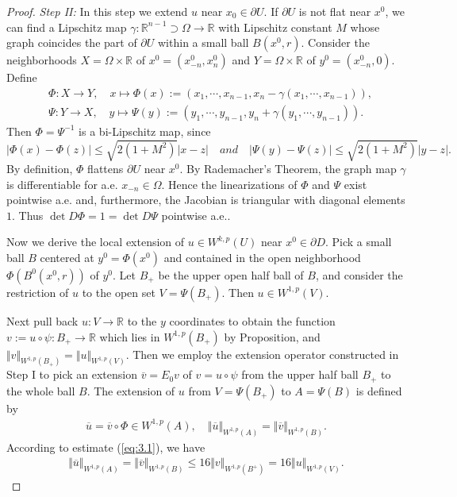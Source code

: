 \documentclass{article}
\numberwithin{equation}{section}
\newcommand{\bbR}{\mathbb{R}}
\newcommand{\ol}{\overline}
\theoremstyle{plain}
\theoremstyle{definition}
\begin{document}
\begin{proof}
\textit{Step II:} In this step we extend $u$ near $x_0\in\partial U$. If $\partial U$ is not flat near $x^0$, we can find a Lipschitz map $\gamma:\bbR^{n-1}\supset\Omega\to\bbR$ with Lipschitz constant $M$ whose graph coincides the part of $\partial U$ within a small ball $B(x^0,r)$. Consider the neighborhoods $X=\Omega\times\bbR$ of $x^0=(x^0_{-n},x^0_n)$ and $Y=\Omega\times\bbR$ of $y^0=(x^0_{-n},0)$. Define
\begin{align*}
	&\Phi:X\to Y,\quad x\mapsto\Phi(x):=(x_1,\cdots,x_{n-1},x_n-\gamma(x_1,\cdots,x_{n-1})),\\
	&\Psi:Y\to X,\quad y\mapsto\Psi(y):=(y_1,\cdots,y_{n-1},y_n+\gamma(y_1,\cdots,y_{n-1})).
\end{align*}
Then $\Phi=\Psi^{-1}$ is a bi-Lipschitz map, since $$\vert\Phi(x)-\Phi(z)\vert\leq\sqrt{2(1+M^2)}\vert x-z\vert\quad and\quad \vert\Psi(y)-\Psi(z)\vert\leq\sqrt{2(1+M^2)}\vert y-z\vert.$$ 
By definition, $\Phi$ flattens $\partial U$ near $x^0$. By Rademacher’s Theorem, the graph map $\gamma$ is
differentiable for a.e. $x_{-n}\in\Omega$. Hence the linearizations of $\Phi$ and $\Psi$ exist pointwise a.e. and, furthermore, the Jacobian is triangular with diagonal elements $1$. Thus $\det D\Phi = 1 = \det D\Psi$ pointwise a.e..

Now we derive the local extension of $u\in W^{k,p}(U)$ near $x^0\in\partial D$. Pick a small ball $B$ centered at $y^0=\Phi(x^0)$ and contained in the open neighborhood $\Phi(B^0(x^0,r))$ of $y^0$. Let $B_+$ be the upper open half ball of $B$, and consider the restriction of $u$ to the open set $V=\Psi(B_+)$. Then $u\in W^{1,p}(V)$.

Next pull back $u:V\to\bbR$ to the $y$ coordinates to obtain the function $v:= u\circ\psi:B_+\to\bbR$ which lies in $W^{1,p}(B_+)$ by Proposition, and $\Vert v\Vert_{W^{1,p}(B_+)}=\Vert u\Vert_{W^{1,p}(V)}$. Then we employ the extension operator constructed in Step I to pick an extension $\ol{v}=E_0v$ of $v=u\circ\psi$ from the upper half ball $B_+$ to the whole ball $B$. The extension of $u$ from $V=\Psi(B_+)$ to $A=\Psi(B)$ is defined by
\begin{align*}
	\ol{u}=\ol{v}\circ\Phi\in W^{1,p}(A),\quad \Vert\ol{u}\Vert_{W^{1,p}(A)}=\Vert\ol{v}\Vert_{W^{1,p}(B)}.
\end{align*}
According to estimate (\ref{eq:3.1}), we have
\begin{align}
	\Vert\ol{u}\Vert_{W^{1,p}(A)}=\Vert\ol{v}\Vert_{W^{1,p}(B)}\leq 16\Vert v\Vert_{W^{1,p}(B^+)}= 16\Vert u\Vert_{W^{1,p}(V)}.\label{eq:3.2}
\end{align}


\end{proof}
\end{document}
